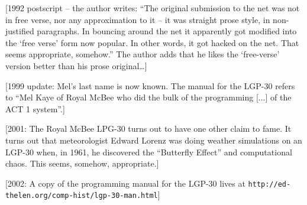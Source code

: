\documentclass[10pt,twoside,openright]{memoir}
\begin{document}
\vskip 0.4in

[1992 postscript -- the author writes: ``The original submission to the net was not in free verse, nor any approximation to it -- it was straight prose style, in non-justified paragraphs. In bouncing around the net it apparently got modified into the `free verse' form now popular. In other words, it got hacked on the net. That seems appropriate, somehow.'' The author adds that he likes the `free-verse' version better than his prose original\dots]

[1999 update: Mel's last name is now known. The manual for the LGP-30 refers to ``Mel Kaye of Royal McBee who did the bulk of the programming [...] of the ACT 1 system''.]

[2001: The Royal McBee LPG-30 turns out to have one other claim to fame. It turns out that meteorologist Edward Lorenz was doing weather simulations on an LGP-30 when, in 1961, he discovered the ``Butterfly Effect'' and computational chaos. This seems, somehow, appropriate.]

[2002: A copy of the programming manual for the LGP-30 lives at {\footnotesize \texttt{http://ed-thelen.org/comp-hist/lgp-30-man.html}}]
\end{document}
